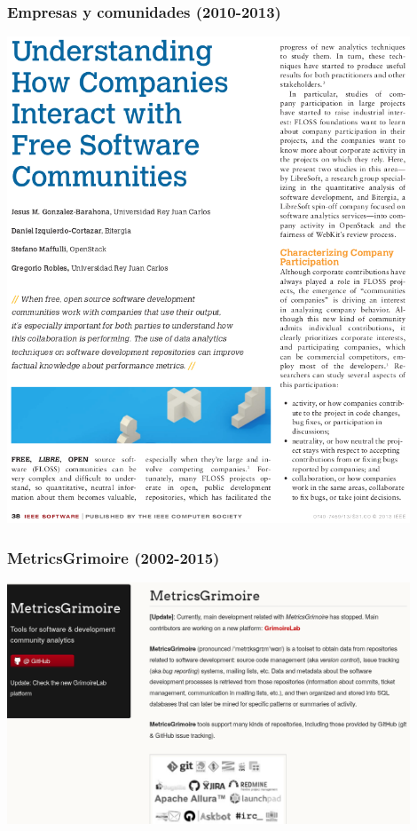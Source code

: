 \begin{frame}[fragile]
  \frametitle{Empresas y comunidades (2010-2013)}

  \begin{center}
  \includegraphics[width=12cm]{figs/software-companies}
  \end{center}  
  
\end{frame}

\begin{frame}[fragile]
  \frametitle{MetricsGrimoire (2002-2015)}

  \begin{center}
  \includegraphics[width=12cm]{figs/metricsgrimoire}
  \end{center}  
  
\end{frame}

